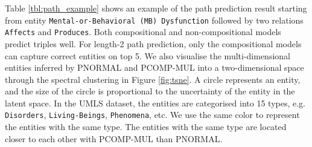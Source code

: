 Table \ref{tbl:path_example} shows an example of the path prediction result 
starting from entity \texttt{Mental-or-Behavioral (MB) Dysfunction} followed by two relations \texttt{Affects} and \texttt{Produces}. 
Both compositional and non-compositional models predict triples well. 
For length-2 path prediction, only the compositional models can capture correct entities on top 5. 
We also visualise the multi-dimensional entities inferred by PNORMAL and PCOMP-MUL 
into a two-dimensional space through the spectral clustering \cite{von2007tutorial} 
in Figure \ref{fig:tsne}. 
A circle represents an entity, 
and the size of the circle is proportional to the uncertainty of the entity in the latent space. 
In the UMLS dataset, the entities are categorised into 15 types, 
e.g. \texttt{Disorders}, \texttt{Living-Beings}, \texttt{Phenomena}, etc. 
We use the same color to represent the entities with the same type.
The entities with the same type are located closer to each other with PCOMP-MUL than PNORMAL.

